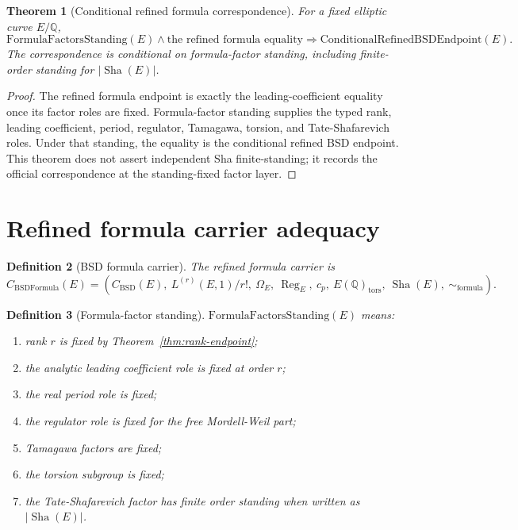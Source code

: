 \documentclass[11pt]{article}
\newtheorem{theorem}{Theorem}[section]
\newtheorem{definition}[theorem]{Definition}
\newcommand{\Q}{\mathbb{Q}}
\newcommand{\Sha}{\operatorname{Sha}}
\newcommand{\Reg}{\operatorname{Reg}}
\newcommand{\tors}{\operatorname{tors}}
\newcommand{\BSD}{\mathrm{BSD}}
\newcommand{\BSDFormula}{\mathrm{BSDFormula}}
\newcommand{\CondRefinedEndpoint}{\mathrm{ConditionalRefinedBSDEndpoint}}
\begin{document}
\begin{theorem}[Conditional refined formula correspondence]\label{thm:conditional-refined-correspondence}
For a fixed elliptic curve $E/\Q$,
\[
\mathrm{FormulaFactorsStanding}(E)\wedge \text{the refined formula equality}
\Rightarrow
\CondRefinedEndpoint(E).
\]
The correspondence is conditional on formula-factor standing, including finite-order standing for $|\Sha(E)|$.
\end{theorem}

\begin{proof}
The refined formula endpoint is exactly the leading-coefficient equality once its factor roles are fixed. Formula-factor standing supplies the typed rank, leading coefficient, period, regulator, Tamagawa, torsion, and Tate-Shafarevich roles. Under that standing, the equality is the conditional refined BSD endpoint. This theorem does not assert independent Sha finite-standing; it records the official correspondence at the standing-fixed factor layer.
\end{proof}

\section{Refined formula carrier adequacy}

\begin{definition}[BSD formula carrier]
The refined formula carrier is
\[
C_{\BSDFormula}(E)=
(C_{\BSD}(E),\ L^{(r)}(E,1)/r!,\ \Omega_E,\ \Reg_E,\ c_p,\ E(\Q)_{\tors},\ \Sha(E),\ \sim_{\mathrm{formula}}).
\]
\end{definition}

\begin{definition}[Formula-factor standing]
$\mathrm{FormulaFactorsStanding}(E)$ means:
\begin{enumerate}[label=(\alph*)]
\item rank $r$ is fixed by Theorem~\ref{thm:rank-endpoint};
\item the analytic leading coefficient role is fixed at order $r$;
\item the real period role is fixed;
\item the regulator role is fixed for the free Mordell-Weil part;
\item Tamagawa factors are fixed;
\item the torsion subgroup is fixed;
\item the Tate-Shafarevich factor has finite order standing when written as $|\Sha(E)|$.
\end{enumerate}
\end{definition}
\end{document}
